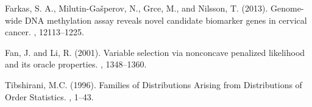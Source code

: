 \begin{thebibliography}{}
Farkas, S. A., Milutin-Gašperov, N.,  Grce, M., and Nilsson, T. (2013).
\newblock Genome-wide DNA methylation assay reveals novel candidate biomarker genes in cervical cancer.
,
12113--1225.

Fan, J. and Li, R. (2001).
\newblock Variable selection via nonconcave penalized likelihood and its oracle properties.
,
1348--1360.

Tibshirani,  M.C. (1996).
\newblock Families of Distributions Arising from Distributions of Order Statistics.
,
1--43.	

\end{thebibliography}



